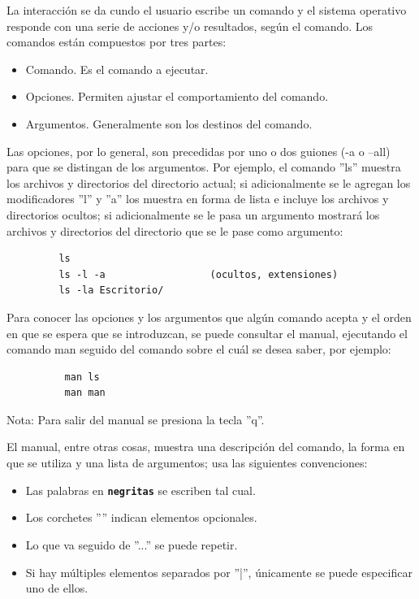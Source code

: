 \documentclass[12pt]{article}
\begin{document}
La interacción se da cundo el usuario escribe un comando y el sistema operativo responde con una serie de acciones y/o resultados, según el comando. Los comandos están compuestos por tres partes:

\begin{itemize}
	\item Comando. Es el comando a ejecutar.
	\item Opciones. Permiten ajustar el comportamiento del comando.
	\item Argumentos. Generalmente son los destinos del comando.
\end{itemize} 

Las opciones, por lo general, son precedidas por uno o dos guiones ({\ttfamily -a o --all}) para que se distingan de los argumentos. Por ejemplo, el comando ''ls'' muestra los archivos y directorios del directorio actual; si adicionalmente se le agregan los modificadores ''l'' y ''a'' los muestra en forma de lista e incluye los archivos y directorios ocultos; si adicionalmente se le pasa un argumento mostrará los archivos y directorios del directorio que se le pase como argumento:

\begin{verbatim}
         ls
         ls -l -a                  (ocultos, extensiones)
         ls -la Escritorio/
\end{verbatim}	

Para conocer las opciones y los argumentos que algún comando acepta y el orden en que se espera que se introduzcan, se puede consultar el manual, ejecutando el comando {\ttfamily man} seguido del comando sobre el cuál se desea saber, por ejemplo:

\begin{verbatim}
          man ls
          man man
\end{verbatim}

Nota: Para salir del manual se presiona la tecla ''q''.

El manual, entre otras cosas, muestra una descripción del comando, la forma en que se utiliza y una lista de argumentos; usa las siguientes convenciones:

\begin{itemize}
\item Las palabras en \textbf{\texttt{negritas}} se escriben tal cual.
\item Los corchetes ''{\ttfamily [ ]}'' indican elementos opcionales.
\item Lo que va seguido de ''{\ttfamily ...}'' se puede repetir.
\item Si hay múltiples elementos separados por ''{\ttfamily |}'', únicamente se puede especificar uno de ellos.
\end{itemize}
\end{document}
